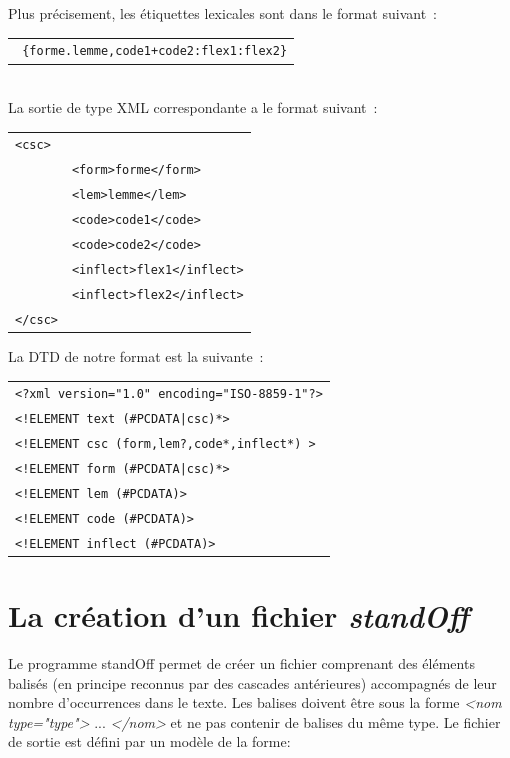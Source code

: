 Plus précisement, les étiquettes lexicales sont dans le format suivant~:\\
\begin{tabular}{c}
\texttt{
\{forme.lemme,code1+code2:flex1:flex2\}}
\end{tabular}\\
La sortie de type XML correspondante a le format suivant~:\\
\begin{tabular}{ll}
\texttt{<csc>}&\\
	&\texttt{<form>forme</form>}\\
	&\texttt{<lem>lemme</lem>}\\
	&\texttt{<code>code1</code>}\\
	&\texttt{<code>code2</code>}\\
	&\texttt{<inflect>flex1</inflect>}\\
	&\texttt{<inflect>flex2</inflect>}\\
\texttt{</csc>}&\\
\end{tabular}

La DTD de notre format est la suivante~:

\begin{tabular}{l}
\texttt{<?xml version="1.0" encoding="ISO-8859-1"?>}\\
\texttt{<!ELEMENT text (\#PCDATA|csc)*>}\\
\texttt{<!ELEMENT csc (form,lem?,code*,inflect*) >}\\
\texttt{<!ELEMENT form (\#PCDATA|csc)*>}\\
\texttt{<!ELEMENT lem (\#PCDATA)>}\\
\texttt{<!ELEMENT code (\#PCDATA)>}\\
\texttt{<!ELEMENT inflect (\#PCDATA)>}\\
\end{tabular}

\section{La création d'un fichier \textit{standOff}}

Le programme standOff permet de créer un fichier comprenant des éléments balisés (en principe reconnus par des cascades antérieures) accompagnés de leur nombre d'occurrences dans le texte. Les balises doivent être sous la forme \emph{<nom type="type">} ... \emph{</nom>} et ne pas contenir de balises du même type. Le fichier de sortie est défini par un modèle de la forme:

